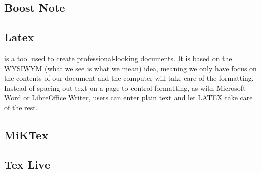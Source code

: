 \subsection{Boost Note}


\subsection{Latex}
\latex{} is a tool used to create professional-looking documents. It is based on the WYSIWYM (what we see is what we mean) idea, meaning we only have focus on the contents of our document and the computer will take care of the formatting. Instead of spacing out text on a page to control formatting, as with Microsoft Word or LibreOffice Writer, users can enter plain text and let LATEX take care of the rest.
\subsection{MiKTex}

\subsection{Tex Live}



